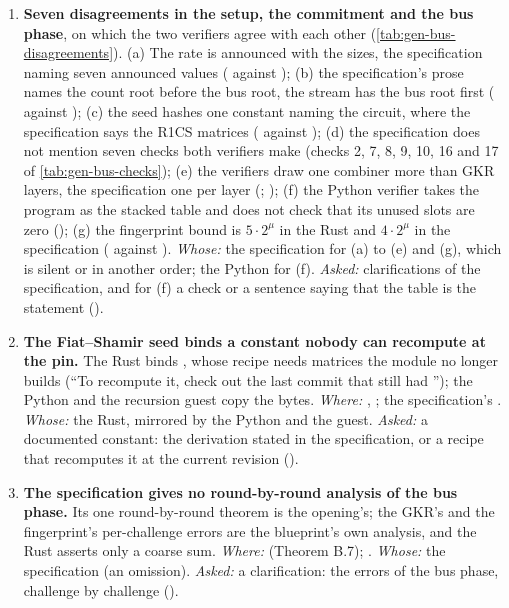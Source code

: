 \begin{sloppypar}
\begin{enumerate}[leftmargin=*, itemsep=5pt]
\item \textbf{Seven disagreements in the setup, the commitment and the bus phase}, on which the
  two verifiers agree with each other (\cref{tab:gen-bus-disagreements}). (a) The rate is announced
  with the sizes, the specification naming seven announced values ( against ); (b) the specification's prose names the count
  root before the bus root, the stream has the bus root first (
  against ); (c) the seed hashes one constant naming the circuit,
  where the specification says the R1CS matrices ( against
  ); (d) the specification does not mention seven checks both
  verifiers make (checks 2, 7, 8, 9, 10, 16 and 17 of \cref{tab:gen-bus-checks}); (e) the verifiers
  draw one combiner more than GKR layers, the specification one per layer
  (; ); (f) the Python verifier takes
  the program as the stacked table and does not check that its unused slots are zero
  (); (g) the fingerprint bound is $5·2^μ$ in the Rust and $4·2^μ$ in the
  specification ( against ).
  \emph{Whose:} the specification for (a) to (e) and (g), which is silent or in another order; the
  Python for (f). \emph{Asked:} clarifications of the specification, and for (f) a check or a
  sentence saying that the table is the statement ().

\item \textbf{The Fiat--Shamir seed binds a constant nobody can recompute at the pin.} The Rust
  binds , whose recipe needs matrices the module no longer builds (\enquote{To
  recompute it, check out the last commit that still had }); the Python and
  the recursion guest copy the bytes. \emph{Where:} ,
  ; the specification's . \emph{Whose:} the Rust,
  mirrored by the Python and the guest. \emph{Asked:} a documented constant: the derivation stated
  in the specification, or a recipe that recomputes it at the current revision ().

\item \textbf{The specification gives no round-by-round analysis of the bus phase.} Its one
  round-by-round theorem is the opening's; the GKR's and the fingerprint's per-challenge errors are
  the blueprint's own analysis, and the Rust asserts only a coarse sum. \emph{Where:}
   (Theorem B.7); .
  \emph{Whose:} the specification (an omission). \emph{Asked:} a clarification: the errors of the
  bus phase, challenge by challenge ().


\end{enumerate}
\end{sloppypar}
